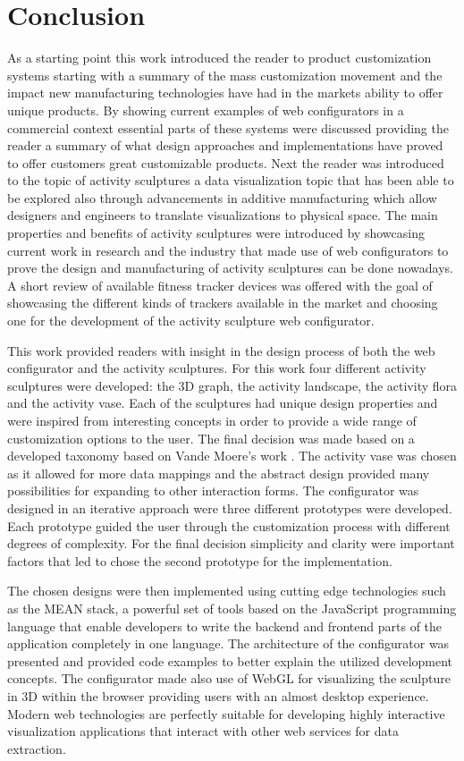 \documentclass[../medieninformatik-arbeit.tex]{subfiles}
\begin{document}
\section{Conclusion}
\label{ch:conclusion}
As a starting point this work introduced the reader to product customization systems starting with a summary of the mass customization movement and the impact new manufacturing technologies have had in the markets ability to offer unique products. By showing current examples of web configurators in a commercial context essential parts of these systems were discussed providing the reader a summary of what design approaches and implementations have proved to offer customers great customizable products. Next the reader was introduced to the topic of activity sculptures a data visualization topic that has been able to be explored also through advancements in additive manufacturing which allow designers and engineers to translate visualizations to physical space. The main properties and benefits of activity sculptures were introduced by showcasing current work in research and the industry that made use of web configurators to prove the design and manufacturing of activity sculptures can be done nowadays. A short review of available fitness tracker devices was offered with the goal of showcasing the different kinds of trackers available in the market and choosing one for the development of the activity sculpture web configurator. 

This work provided readers with insight in the design process of both the web configurator and the activity sculptures. For this work four different activity sculptures were developed: the 3D graph, the activity landscape, the activity flora and the activity vase. Each of the sculptures had unique design properties and were inspired from interesting concepts in order to provide a wide range of customization options to the user. The final decision was made based on a developed taxonomy based on Vande Moere's work \cite{vande2009analyzing}. The activity vase was chosen as it allowed for more data mappings and the abstract design provided many possibilities for expanding to other interaction forms. The configurator was designed in an iterative approach were three different prototypes were developed. Each prototype guided the user through the customization process with different degrees of complexity. For the final decision simplicity and clarity were important factors that led to chose the second prototype for the implementation. 

The chosen designs were then implemented using cutting edge technologies such as the MEAN stack, a powerful set of tools based on the JavaScript programming language that enable developers to write the backend and frontend parts of the application completely in one language. The architecture of the configurator was presented and provided code examples to better explain the utilized development concepts. The configurator made also use of WebGL for visualizing the sculpture in 3D within the browser providing users with an almost desktop experience. Modern web technologies are perfectly suitable for developing highly interactive visualization applications that interact with other web services for data extraction. 
\end{document}
